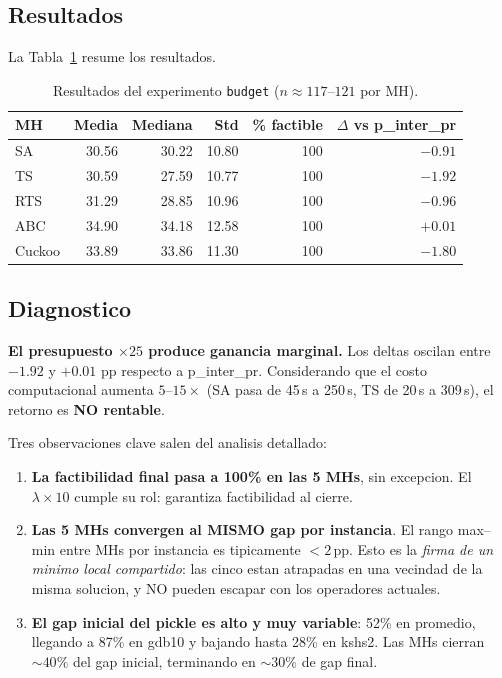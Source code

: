 \subsection{Resultados}

La Tabla~\ref{tab:budget-resultados} resume los resultados.

\begin{table}[h]
\centering
\caption{Resultados del experimento \texttt{budget} ($n \approx 117$--$121$ por MH).}
\label{tab:budget-resultados}
\small
\begin{tabular}{lrrrrr}
\toprule
MH & Media & Mediana & Std & \% factible & $\Delta$ vs p\_inter\_pr \\
\midrule
SA      & 30.56 & 30.22 & 10.80 & 100 & $-0.91$ \\
TS      & 30.59 & 27.59 & 10.77 & 100 & $-1.92$ \\
RTS     & 31.29 & 28.85 & 10.96 & 100 & $-0.96$ \\
ABC     & 34.90 & 34.18 & 12.58 & 100 & $+0.01$ \\
Cuckoo  & 33.89 & 33.86 & 11.30 & 100 & $-1.80$ \\
\bottomrule
\end{tabular}
\end{table}

\subsection{Diagnostico}

\textbf{El presupuesto $\times 25$ produce ganancia marginal.} Los
deltas oscilan entre $-1.92$ y $+0.01$ pp respecto a p\_inter\_pr.
Considerando que el costo computacional aumenta $5$--$15 \times$
(SA pasa de 45\,s a 250\,s, TS de 20\,s a 309\,s), el retorno es
\textbf{NO rentable}.

Tres observaciones clave salen del analisis detallado:

\begin{enumerate}
\item \textbf{La factibilidad final pasa a 100\% en las 5 MHs}, sin
  excepcion. El $\lambda \times 10$ cumple su rol: garantiza
  factibilidad al cierre.
\item \textbf{Las 5 MHs convergen al MISMO gap por instancia}. El
  rango max--min entre MHs por instancia es tipicamente $<2$\,pp.
  Esto es la \emph{firma de un minimo local compartido}: las cinco
  estan atrapadas en una vecindad de la misma solucion, y NO pueden
  escapar con los operadores actuales.
\item \textbf{El gap inicial del pickle es alto y muy variable}: 52\%
  en promedio, llegando a 87\% en gdb10 y bajando hasta 28\% en kshs2.
  Las MHs cierran $\sim 40\%$ del gap inicial, terminando en
  $\sim 30\%$ de gap final.
\end{enumerate}

